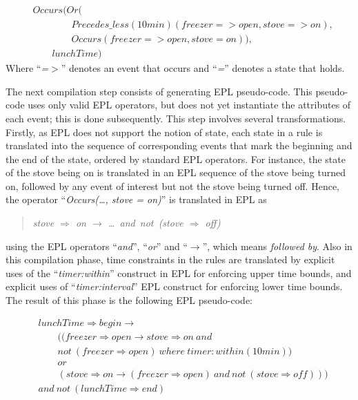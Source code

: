 \mathleft
\footnotesize
\begin{equation*}
  \begin{split}
&Occurs(Or(\\
&\quad\quad\quad\quad Precedes\_less(10min)(freezer => open, stove => on), \\
&\quad\quad\quad\quad Occurs(freezer => open, stove = on)), \\
&\quad\quad lunchTime)
  \end{split}
\end{equation*}
\normalsize
\noindent
Where ``{\em =$>$}'' denotes an event that occurs and ``{\em =}'' denotes a state that holds.

The next compilation step consists of generating EPL pseudo-code. This pseudo-code uses only valid EPL operators, but does not yet instantiate the attributes of each event; this is done subsequently.  This step involves several transformations.  Firstly, as EPL does not support the notion of state, each state in a rule is translated into the sequence of corresponding events that mark the beginning and the end of the state, ordered by standard EPL operators. For instance, the state of the stove being on is translated in an EPL sequence of the stove being turned on, followed by any event of interest but not the stove being turned off. Hence, the operator ``{\em Occurs(\dots, stove = on)}'' is translated in EPL as 
\begin{quote} {\em stove $\Rightarrow$ on $\rightarrow$ \dots\ and\ not\ (stove $\Rightarrow$ off)} \end{quote}
\noindent 
using the EPL operators ``{\em and}'', ``{\em or}'' and ``$\rightarrow$'', which means {\em followed by}.  Also in this compilation phase, time constraints in the rules are translated by explicit uses of the ``{\em timer:within}'' construct in EPL for enforcing upper time bounds, and explicit uses of ``{\em timer:interval}'' EPL construct for enforcing lower time bounds.  The result of this phase is the following EPL pseudo-code:

\footnotesize
\begin{equation*}
  \begin{split}
&lunchTime\Rightarrow begin \rightarrow\\
&\quad\quad ( ( freezer\Rightarrow open \rightarrow  stove\Rightarrow on\ and\\ 
&\quad\quad not\ ( freezer\Rightarrow open )\ where\ timer:within(10min) )\\ 
&\quad\quad or\\  
&\quad\quad ( stove\Rightarrow on \rightarrow  ( freezer\Rightarrow open )\ and\ not\ ( stove\Rightarrow off ) ) )  \\
&and\ not\ ( lunchTime\Rightarrow end )
  \end{split}
\end{equation*}
\normalsize

